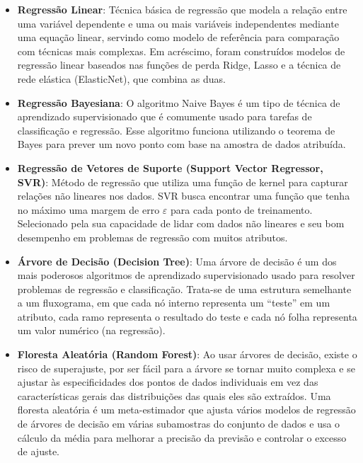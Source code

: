         \begin{itemize}
            \item[(i)] \textbf{Regressão Linear}: Técnica básica de regressão que modela a relação entre uma variável dependente e uma ou mais variáveis independentes mediante uma equação linear, servindo como modelo de referência para comparação com técnicas mais complexas.
            Em acréscimo, foram construídos modelos de regressão linear baseados nas funções de perda Ridge, Lasso e a técnica de rede elástica (ElasticNet), que combina as duas.
            
            \item[(ii)] \textbf{Regressão Bayesiana}: O algoritmo Naive Bayes é um tipo de técnica de aprendizado supervisionado que é comumente usado para tarefas de classificação e regressão. Esse algoritmo funciona utilizando o teorema de Bayes para prever um novo ponto com base na amostra de dados atribuída.
            
            \item[(iii)] \textbf{Regressão de Vetores de Suporte (Support Vector Regressor, SVR)}: Método de regressão que utiliza uma função de kernel para capturar relações não lineares nos dados. SVR busca encontrar uma função que tenha no máximo uma margem de erro \(\varepsilon\) para cada ponto de treinamento. Selecionado pela sua capacidade de lidar com dados não lineares e seu bom desempenho em problemas de regressão com muitos atributos.

            \item[(iv)] \textbf{Árvore de Decisão (Decision Tree)}: Uma árvore de decisão é um dos mais poderosos algoritmos de aprendizado supervisionado usado para resolver problemas de regressão e classificação.
            Trata-se de uma estrutura semelhante a um fluxograma, em que cada nó interno representa um “teste” em um atributo, cada ramo representa o resultado do teste e cada nó folha representa um valor numérico (na regressão).
            
            \item[(v)] \textbf{Floresta Aleatória (Random Forest)}:
            Ao usar árvores de decisão, existe o risco de superajuste, por ser fácil para a árvore se tornar muito complexa e se ajustar às especificidades dos pontos de dados individuais em vez das características gerais das distribuições das quais eles são extraídos. Uma floresta aleatória é um meta-estimador que ajusta vários modelos de regressão de árvores de decisão em várias subamostras do conjunto de dados e usa o cálculo da média para melhorar a precisão da previsão e controlar o excesso de ajuste.


\end{itemize}
